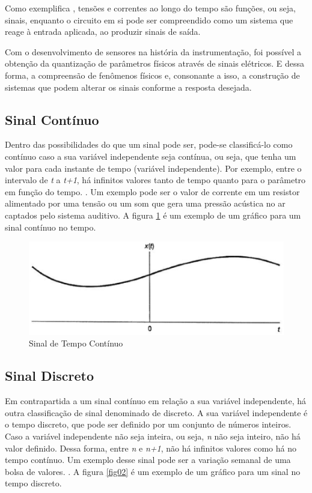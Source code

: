 Como exemplifica \cite{oppenheim2010sinais}, tensões e correntes ao longo do tempo são funções, ou seja, sinais, enquanto o circuito em si pode ser compreendido como um sistema que reage à entrada aplicada, ao produzir sinais de saída.

Com o desenvolvimento de sensores na história da instrumentação, foi possível a obtenção da quantização de parâmetros físicos através de sinais elétricos. E dessa forma, a compreensão de fenômenos físicos e, consonante a isso, a construção de sistemas que podem alterar os sinais conforme a resposta desejada. 

\subsection{Sinal Contínuo}
Dentro das possibilidades do que um sinal pode ser, pode-se classificá-lo como contínuo caso a sua variável independente seja contínua, ou seja, que tenha um valor para cada instante de tempo (variável independente). Por exemplo, entre o intervalo de \textit{t} a \textit{t+1}, há infinitos valores tanto de tempo quanto para o parâmetro em função do tempo. \cite{oppenheim2010sinais}. Um exemplo pode ser o valor de corrente em um resistor alimentado por uma tensão ou um som que gera uma pressão acústica no ar captados pelo sistema auditivo. A figura \ref{fig01} é um exemplo de um gráfico para um sinal contínuo no tempo. 

\begin{figure}[h]
	\centering
	\includegraphics[scale=0.5]{figuras/fig01.eps}
	\caption{Sinal de Tempo Contínuo}
	\label{fig01}
\end{figure}
\newpage
\subsection{Sinal Discreto}
Em contrapartida a um sinal contínuo em relação a sua variável independente, há outra classificação de sinal denominado de discreto. A sua variável independente é o tempo discreto, que pode ser definido por um conjunto de números inteiros. Caso a variável independente não seja inteira, ou seja, \textit{n} não seja inteiro, não há  valor definido. Dessa forma, entre \textit{n} e \textit{n+1}, não há infinitos valores como há no tempo contínuo. Um exemplo desse sinal pode ser a variação semanal de uma bolsa de valores. \cite{oppenheim2010sinais}. A figura \ref{fig02} é um exemplo de um gráfico para um sinal no tempo discreto. 


